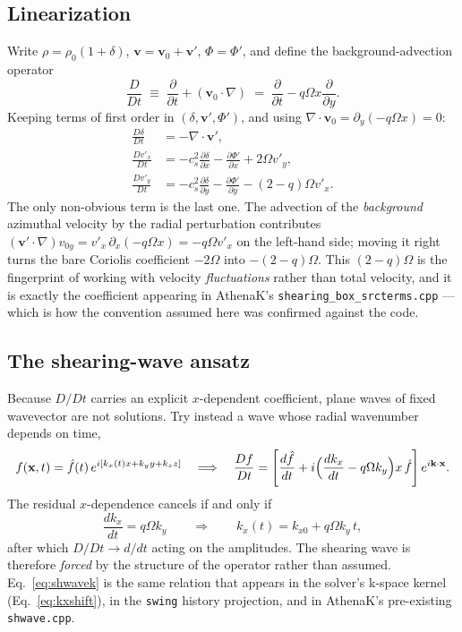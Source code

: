 \documentclass[11pt]{article}
\newcommand{\code}[1]{\texttt{#1}}
\begin{document}
\subsection{Linearization}
Write $\rho=\rho_0(1+\delta)$, $\mathbf{v}=\mathbf{v}_0+\mathbf{v}'$, $\Phi=\Phi'$, and
define the background-advection operator
\begin{equation}
  \frac{D}{Dt} \;\equiv\; \frac{\partial}{\partial t} + (\mathbf{v}_0\cdot\nabla)
  \;=\; \frac{\partial}{\partial t} - q\Omega x\frac{\partial}{\partial y}.
\end{equation}
Keeping terms of first order in $(\delta,\mathbf{v}',\Phi')$, and using
$\nabla\cdot\mathbf{v}_0 = \partial_y(-q\Omega x)=0$:
\begin{align}
  \frac{D\delta}{Dt} &= -\nabla\cdot\mathbf{v}', \\
  \frac{Dv'_x}{Dt} &= -c_s^2\frac{\partial\delta}{\partial x}
                      - \frac{\partial\Phi'}{\partial x} + 2\Omega v'_y, \\
  \frac{Dv'_y}{Dt} &= -c_s^2\frac{\partial\delta}{\partial y}
                      - \frac{\partial\Phi'}{\partial y} - (2-q)\Omega v'_x .
  \label{eq:ymom}
\end{align}
The only non-obvious term is the last one. The advection of the \emph{background}
azimuthal velocity by the radial perturbation contributes
$(\mathbf{v}'\cdot\nabla)v_{0y} = v'_x\,\partial_x(-q\Omega x) = -q\Omega v'_x$ on the
left-hand side; moving it right turns the bare Coriolis coefficient $-2\Omega$ into
$-(2-q)\Omega$. This $(2-q)\Omega$ is the fingerprint of working with velocity
\emph{fluctuations} rather than total velocity, and it is exactly the coefficient
appearing in AthenaK's \code{shearing\_box\_srcterms.cpp} --- which is how the
convention assumed here was confirmed against the code.

\subsection{The shearing-wave ansatz}
Because $D/Dt$ carries an explicit $x$-dependent coefficient, plane waves of fixed
wavevector are not solutions. Try instead a wave whose radial wavenumber depends on
time,
\begin{equation}
  f(\mathbf{x},t) = \hat f(t)\,e^{i[k_x(t)x + k_yy + k_zz]}
  \quad\Longrightarrow\quad
  \frac{Df}{Dt} = \left[\frac{d\hat f}{dt}
    + i\Bigl(\frac{dk_x}{dt} - q\Omega k_y\Bigr)x\,\hat f\right]e^{i\mathbf{k}\cdot\mathbf{x}} .
\end{equation}
The residual $x$-dependence cancels if and only if
\begin{equation}
  \frac{dk_x}{dt} = q\Omega k_y
  \qquad\Longrightarrow\qquad
  k_x(t) = k_{x0} + q\Omega k_y\,t ,
  \label{eq:shwavek}
\end{equation}
after which $D/Dt \to d/dt$ acting on the amplitudes. The shearing wave is therefore
\emph{forced} by the structure of the operator rather than assumed. Eq.~\eqref{eq:shwavek}
is the same relation that appears in the solver's k-space kernel
(Eq.~\ref{eq:kxshift}), in the \code{swing} history projection, and in AthenaK's
pre-existing \code{shwave.cpp}.
\end{document}
